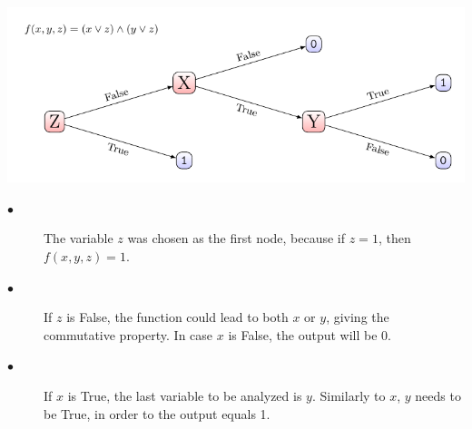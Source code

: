 \includegraphics{decision_tree.pdf}
\begin{description}
	\item[$\bullet$] The variable $z$ was chosen as the first node, because if $z = 1$, then $f(x,y,z) = 1$.
	\item[$\bullet$] If $z$ is False, the function could lead to both $x$ or $y$, giving the commutative property. In case $x$ is False, the output will be 0.
	\item[$\bullet$] If $x$ is True, the last variable to be analyzed is $y$. Similarly to $x$, $y$ needs to be True, in order to the output equals 1.
\end{description}

